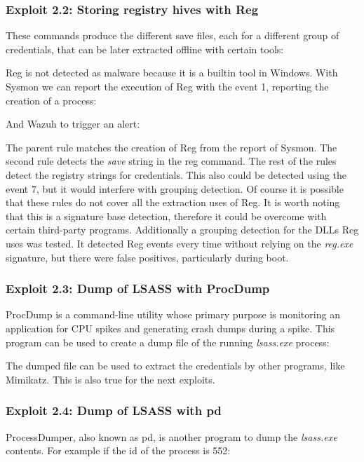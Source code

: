 \subsubsection{Exploit 2.2: Storing registry hives with Reg}
These commands produce the different save files, each for a different group of credentials, that can be later extracted offline with certain tools\cite{more_dumps}:

\linej
Reg is not detected as malware because it is a builtin tool in Windows. With Sysmon we can report the execution of Reg with the event 1, reporting the creation of a process:

\linej
And Wazuh to trigger an alert:

\linej
The parent rule matches the creation of Reg from the report of Sysmon.
\linej
The second rule detects the \textit{save} string in the reg command.
\linej
The rest of the rules detect the registry strings for credentials.
\linej
\linej
This also could be detected using the event 7, but it would interfere with grouping detection. Of course it is possible that these rules do not cover all the extraction uses of Reg. It is worth noting that this is a signature base detection, therefore it could be overcome with certain third-party programs.
\linej
\linej
Additionally a grouping detection for the DLLs Reg uses was tested. It detected Reg events every time without relying on the \textit{reg.exe} signature, but there were false positives, particularly during boot.

\subsubsection{Exploit 2.3: Dump of LSASS with ProcDump}
ProcDump\cite{procdump} is a command-line utility whose primary purpose is monitoring an application for CPU spikes and generating crash dumps during a spike. This program can be used to create a dump file of the running \textit{lsass.exe} process:

\linej
The dumped file can be used to extract the credentials by other programs, like Mimikatz\cite{more_dumps}. This is also true for the next exploits.

\subsubsection{Exploit 2.4: Dump of LSASS with pd}
ProcessDumper, also known as pd\cite{pd}, is another program to dump the \textit{lsass.exe} contents. For example if the id of the process is 552:


